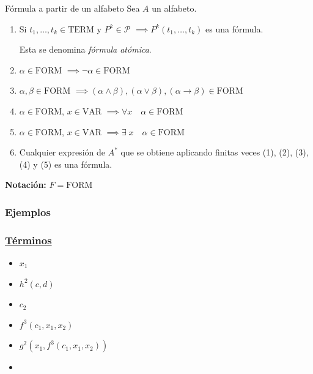\begin{definicion}{Fórmula a partir de un alfabeto}{}
    Sea $A$ un alfabeto.

    \medskip

    \begin{enumerate}
        \item Si $t_1, \dotsc, t_k \in  \mathrm{TERM}$ 
            y $P^{k} \in \mathcal{P}$
                $\implies P^{k}(t_1, \dotsc, t_k)$ es una fórmula.

            Esta se denomina \textit{fórmula atómica}.
        \item $\alpha \in \mathrm{FORM}$
            $\implies \neg \alpha \in \mathrm{FORM}$

        \item $\alpha, \beta \in \mathrm{FORM}$
            $\implies (\alpha\wedge\beta),(\alpha\vee\beta),
            (\alpha\to\beta) \in \mathrm{FORM}$
        \item $\alpha \in \mathrm{FORM}$, $x \in \mathrm{VAR}$
            $\implies \forall x \quad \alpha \in \mathrm{FORM}$
        \item $\alpha \in \mathrm{FORM}$, $x \in \mathrm{VAR}$
            $\implies \exists\; x \quad \alpha \in \mathrm{FORM}$
        \item Cualquier expresión de $A^{*}$ que se obtiene aplicando
            finitas veces (1), (2), (3), (4) y (5) es una fórmula.
    \end{enumerate}

    \bigskip
    \textbf{Notación:}
    $F = \mathrm{FORM}$
\end{definicion}

\subsubsection{Ejemplos}

\subsubsection{\underline{Términos}}

\begin{multicols}{2}
    \begin{itemize}
            \item $x_1$
            \item $h^{2}(c,d)$ %
            \item $c_2$
            \item $f^{3} (c_1, x_1, x_2)$
            \item $g^{2}(x_1, f^{3}(c_1, x_1, x_2))$
            \item[\vspace{\fill}]
    \end{itemize}
\end{multicols}


